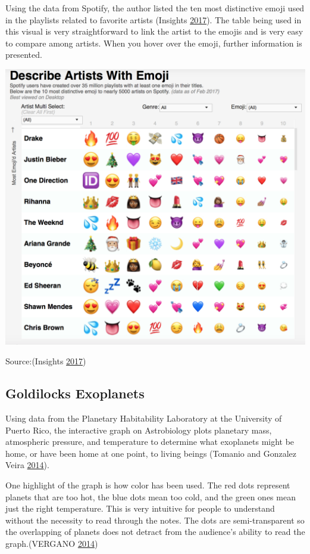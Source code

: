 \documentclass[]{book}
\begin{document}
Using the data from Spotify, the author listed the ten most distinctive emoji used in the playlists related to favorite artists (Insights \protect\hyperlink{ref-artist_emoji}{2017}). The table being used in this visual is very straightforward to link the artist to the emojis and is very easy to compare among artists. When you hover over the emoji, further information is presented.

\includegraphics{images/artist_emoji.png}

Source:(Insights \protect\hyperlink{ref-artist_emoji}{2017})

\hypertarget{goldilocks-exoplanets}{%
\subsection{Goldilocks Exoplanets}\label{goldilocks-exoplanets}}

Using data from the Planetary Habitability Laboratory at the University of Puerto Rico, the interactive graph on Astrobiology plots planetary mass, atmospheric pressure, and temperature to determine what exoplanets might be home, or have been home at one point, to living beings (Tomanio and Gonzalez Veira \protect\hyperlink{ref-goldilocks_worlds}{2014}).

One highlight of the graph is how color has been used. The red dots represent planets that are too hot, the blue dots mean too cold, and the green ones mean just the right temperature. This is very intuitive for people to understand without the necessity to read through the notes. The dots are semi-transparent so the overlapping of planets does not detract from the audience's ability to read the graph.(VERGANO \protect\hyperlink{ref-Dan}{2014})
\end{document}
